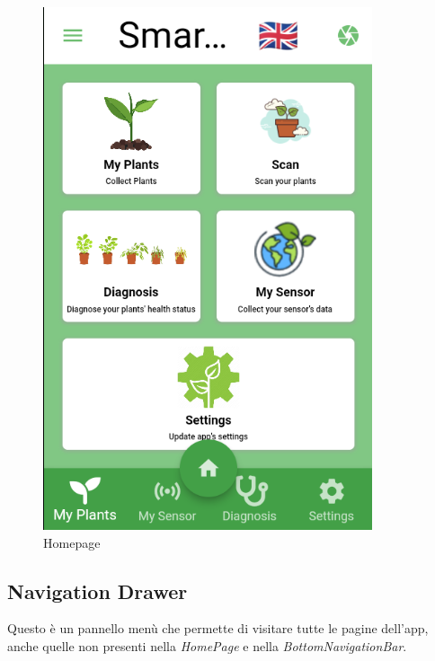 \documentclass[a4paper,12pt]{report}
\begin{document}
\begin{figure}[ht] 
	\centering
	\includegraphics[width=.5\textwidth, height=.5\textheight, keepaspectratio]{./images/home/home_screen.png}
	\caption{Homepage}
	\label{fig:homepage}
\end{figure}

\subsection{Navigation Drawer}

\textsf{\small Questo è un pannello menù che permette di visitare tutte le pagine dell'app, anche quelle non presenti nella \emph{HomePage} e nella \emph{BottomNavigationBar}.}
\end{document}
